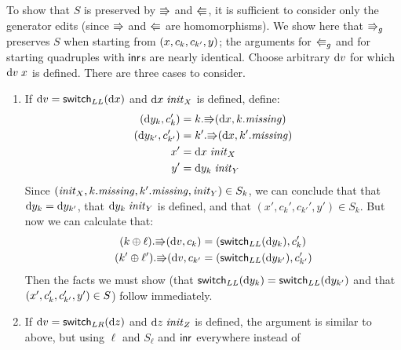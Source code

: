 \begin{pf}
\begin{itemize}
            To show that $S$ is preserved by $\mathord{\Rrightarrow}$ and $\mathord{\Lleftarrow}$, it is
            sufficient to consider only the generator edits (since $\mathord{\Rrightarrow}$
            and $\mathord{\Lleftarrow}$ are homomorphisms). We show here that $\mathord{\Rrightarrow}_g$
            preserves $S$ when starting from $(
            x,{c_k},{c_{k'}}, y)$; the arguments for
            $\mathord{\Lleftarrow}_g$ and for starting quadruples with $\mathsf{inr}$s are
            nearly identical. Choose arbitrary $\textrm{d} v$ for which $\textrm{d} v\;
            x$ is defined. There are three cases to consider.

            \begin{enumerate}
                \item If $\textrm{d} v=\mathsf{switch}_{LL}(\textrm{d} x)$ and $\textrm{d} x\;\mathit{init}_X$ is
                    defined, define:
                    \begin{align*}
                        (\textrm{d} y_k,c_k') &= k.\mathord{\Rrightarrow}(\textrm{d} x,k.\mathit{missing}) \\
                        (\textrm{d} y_{k'},c_{k'}') &= k'.\mathord{\Rrightarrow}(\textrm{d} x,k'.\mathit{missing}) \\
                        x' &= \textrm{d} x\;\mathit{init}_X \\
                        y' &= \textrm{d} y_k\;\mathit{init}_Y
                    \end{align*}
                    Since $(\mathit{init}_X,k.\mathit{missing},k'.\mathit{missing},\mathit{init}_Y) \in
                    S_k$, we can conclude that that $\textrm{d} y_k=\textrm{d} y_{k'}$, that
                    $\textrm{d} y_k\;\mathit{init}_Y$ is defined, and that
                    $(x',c_k',c_{k'}',y') \in S_k$. But now we can calculate
                    that:
                    \begin{align*}
                        (k\oplus\ell).\mathord{\Rrightarrow}(\textrm{d} v,{c_k}) &=
                        (\mathsf{switch}_{LL}(\textrm{d} y_k),{c_k'}) \\
                        (k'\oplus\ell').\mathord{\Rrightarrow}(\textrm{d} v,{c_{k'}} &=
                        (\mathsf{switch}_{LL}(\textrm{d} y_{k'}),{c_{k'}'})
                    \end{align*}
                    Then the facts we must show (that
                    $\mathsf{switch}_{LL}(\textrm{d} y_k)=\mathsf{switch}_{LL}(\textrm{d} y_{k'})$ and
                    that
                    $({x'},{c_k'},{c_{k'}'},{y'})
                    \in S$) follow immediately.
                \item If $\textrm{d} v=\mathsf{switch}_{LR}(\textrm{d} z)$ and $\textrm{d} z\;\mathit{init}_Z$ is
                    defined, the argument is similar to above, but using
                    $\ell$ and $S_\ell$ and $\mathsf{inr}$ everywhere instead of

\end{enumerate}
\end{itemize}
\end{pf}
